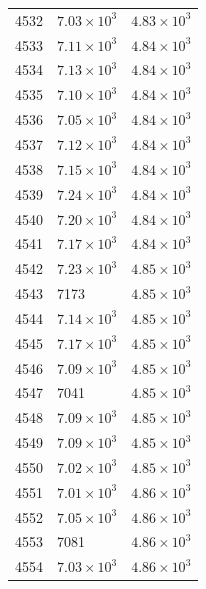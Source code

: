 \begin{table}[H]
\begin{tabular}{lll}
4532 & $\displaystyle 7.03 \times 10^{3}$ & $\displaystyle 4.83 \times 10^{3}$ \\
4533 & $\displaystyle 7.11 \times 10^{3}$ & $\displaystyle 4.84 \times 10^{3}$ \\
4534 & $\displaystyle 7.13 \times 10^{3}$ & $\displaystyle 4.84 \times 10^{3}$ \\
4535 & $\displaystyle 7.10 \times 10^{3}$ & $\displaystyle 4.84 \times 10^{3}$ \\
4536 & $\displaystyle 7.05 \times 10^{3}$ & $\displaystyle 4.84 \times 10^{3}$ \\
4537 & $\displaystyle 7.12 \times 10^{3}$ & $\displaystyle 4.84 \times 10^{3}$ \\
4538 & $\displaystyle 7.15 \times 10^{3}$ & $\displaystyle 4.84 \times 10^{3}$ \\
4539 & $\displaystyle 7.24 \times 10^{3}$ & $\displaystyle 4.84 \times 10^{3}$ \\
4540 & $\displaystyle 7.20 \times 10^{3}$ & $\displaystyle 4.84 \times 10^{3}$ \\
4541 & $\displaystyle 7.17 \times 10^{3}$ & $\displaystyle 4.84 \times 10^{3}$ \\
4542 & $\displaystyle 7.23 \times 10^{3}$ & $\displaystyle 4.85 \times 10^{3}$ \\
4543 & 7173 & $\displaystyle 4.85 \times 10^{3}$ \\
4544 & $\displaystyle 7.14 \times 10^{3}$ & $\displaystyle 4.85 \times 10^{3}$ \\
4545 & $\displaystyle 7.17 \times 10^{3}$ & $\displaystyle 4.85 \times 10^{3}$ \\
4546 & $\displaystyle 7.09 \times 10^{3}$ & $\displaystyle 4.85 \times 10^{3}$ \\
4547 & 7041 & $\displaystyle 4.85 \times 10^{3}$ \\
4548 & $\displaystyle 7.09 \times 10^{3}$ & $\displaystyle 4.85 \times 10^{3}$ \\
4549 & $\displaystyle 7.09 \times 10^{3}$ & $\displaystyle 4.85 \times 10^{3}$ \\
4550 & $\displaystyle 7.02 \times 10^{3}$ & $\displaystyle 4.85 \times 10^{3}$ \\
4551 & $\displaystyle 7.01 \times 10^{3}$ & $\displaystyle 4.86 \times 10^{3}$ \\
4552 & $\displaystyle 7.05 \times 10^{3}$ & $\displaystyle 4.86 \times 10^{3}$ \\
4553 & 7081 & $\displaystyle 4.86 \times 10^{3}$ \\
4554 & $\displaystyle 7.03 \times 10^{3}$ & $\displaystyle 4.86 \times 10^{3}$ \\

\end{tabular}
\end{table}
